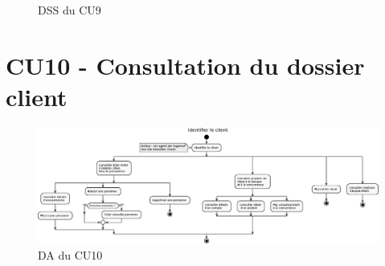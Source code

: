 \begin{figure}[H]
\noindent{}
\caption{DSS du CU9}
\end{figure}

\clearpage
\section{CU10 - Consultation du dossier client}
\begin{figure}[H]
\centering
\includegraphics[width=24cm, angle=90]{figures/eps/DA_CU10.eps}
\caption{DA du CU10}
\end{figure}


